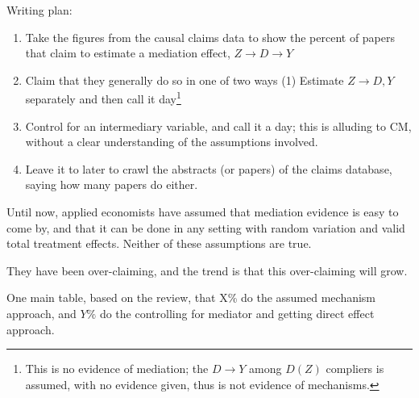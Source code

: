 Writing plan:
\begin{enumerate}
    \item Take the figures from the causal claims data to show the percent of papers that claim to estimate a mediation effect, $Z \to D \to Y$
    \item Claim that they generally do so in one of two ways (1) Estimate $Z \to D, Y$ separately and then call it day\footnote{
        This is no evidence of mediation; the $D \to Y$ among $D(Z)$ compliers is assumed, with no evidence given, thus is not evidence of mechanisms.
    }
    \item Control for an intermediary variable, and call it a day; this is alluding to CM, without a clear understanding of the assumptions involved.
    \item Leave it to later to crawl the abstracts (or papers) of the claims database, saying how many papers do either.
\end{enumerate}

Until now, applied economists have assumed that mediation evidence is easy to come by, and that it can be done in any setting with random variation and valid total treatment effects.
Neither of these assumptions are true.

They have been over-claiming, and the trend is that this over-claiming will grow.


One main table, based on the review, that X\% do the assumed mechanism approach, and $Y\%$ do the controlling for mediator and getting direct effect approach.
